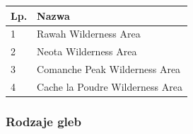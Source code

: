\documentclass[11pt]{article} %
\begin{document}
\begin{center}
    \begin{tabular}{ | l | l | }
    \hline
    	Lp. & Nazwa \\ \hline
    	1 &Rawah Wilderness Area \\
	2 & Neota Wilderness Area \\
	3 & Comanche Peak Wilderness Area \\
	4 & Cache la Poudre Wilderness Area \\ \hline
    \end{tabular}
\end{center}

\subsubsection{Rodzaje gleb}
\end{document}
